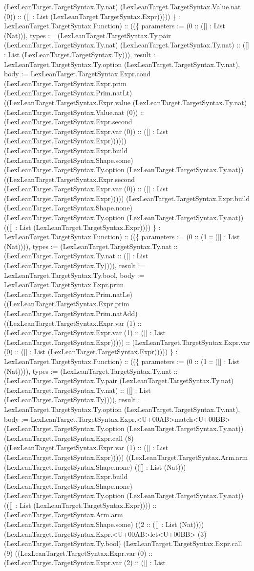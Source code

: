 \documentclass[11pt]{article}
\begin{document}
(LexLeanTarget.TargetSyntax.Ty.nat) (LexLeanTarget.TargetSyntax.Value.nat (0)) :: ([] : List (LexLeanTarget.TargetSyntax.Expr))))) \} : LexLeanTarget.TargetSyntax.Function) :: ((\{ parameters := (0 :: ([] : List (Nat))), types := (LexLeanTarget.TargetSyntax.Ty.pair (LexLeanTarget.TargetSyntax.Ty.nat) (LexLeanTarget.TargetSyntax.Ty.nat) :: ([] : List (LexLeanTarget.TargetSyntax.Ty))), result := LexLeanTarget.TargetSyntax.Ty.option (LexLeanTarget.TargetSyntax.Ty.nat), body := LexLeanTarget.TargetSyntax.Expr.cond (LexLeanTarget.TargetSyntax.Expr.prim (LexLeanTarget.TargetSyntax.Prim.natLt) ((LexLeanTarget.TargetSyntax.Expr.value (LexLeanTarget.TargetSyntax.Ty.nat) (LexLeanTarget.TargetSyntax.Value.nat (0)) :: (LexLeanTarget.TargetSyntax.Expr.second (LexLeanTarget.TargetSyntax.Expr.var (0)) :: ([] : List (LexLeanTarget.TargetSyntax.Expr)))))) (LexLeanTarget.TargetSyntax.Expr.build (LexLeanTarget.TargetSyntax.Shape.some) (LexLeanTarget.TargetSyntax.Ty.option (LexLeanTarget.TargetSyntax.Ty.nat)) ((LexLeanTarget.TargetSyntax.Expr.second (LexLeanTarget.TargetSyntax.Expr.var (0)) :: ([] : List (LexLeanTarget.TargetSyntax.Expr))))) (LexLeanTarget.TargetSyntax.Expr.build (LexLeanTarget.TargetSyntax.Shape.none) (LexLeanTarget.TargetSyntax.Ty.option (LexLeanTarget.TargetSyntax.Ty.nat)) (([] : List (LexLeanTarget.TargetSyntax.Expr)))) \} : LexLeanTarget.TargetSyntax.Function) :: ((\{ parameters := (0 :: (1 :: ([] : List (Nat)))), types := (LexLeanTarget.TargetSyntax.Ty.nat :: (LexLeanTarget.TargetSyntax.Ty.nat :: ([] : List (LexLeanTarget.TargetSyntax.Ty)))), result := LexLeanTarget.TargetSyntax.Ty.bool, body := LexLeanTarget.TargetSyntax.Expr.prim (LexLeanTarget.TargetSyntax.Prim.natLe) ((LexLeanTarget.TargetSyntax.Expr.prim (LexLeanTarget.TargetSyntax.Prim.natAdd) ((LexLeanTarget.TargetSyntax.Expr.var (1) :: (LexLeanTarget.TargetSyntax.Expr.var (1) :: ([] : List (LexLeanTarget.TargetSyntax.Expr))))) :: (LexLeanTarget.TargetSyntax.Expr.var (0) :: ([] : List (LexLeanTarget.TargetSyntax.Expr))))) \} : LexLeanTarget.TargetSyntax.Function) :: ((\{ parameters := (0 :: (1 :: ([] : List (Nat)))), types := (LexLeanTarget.TargetSyntax.Ty.nat :: (LexLeanTarget.TargetSyntax.Ty.pair (LexLeanTarget.TargetSyntax.Ty.nat) (LexLeanTarget.TargetSyntax.Ty.nat) :: ([] : List (LexLeanTarget.TargetSyntax.Ty)))), result := LexLeanTarget.TargetSyntax.Ty.option (LexLeanTarget.TargetSyntax.Ty.nat), body := LexLeanTarget.TargetSyntax.Expr.<U+00AB>match<U+00BB> (LexLeanTarget.TargetSyntax.Ty.option (LexLeanTarget.TargetSyntax.Ty.nat)) (LexLeanTarget.TargetSyntax.Expr.call (8) ((LexLeanTarget.TargetSyntax.Expr.var (1) :: ([] : List (LexLeanTarget.TargetSyntax.Expr))))) ((LexLeanTarget.TargetSyntax.Arm.arm (LexLeanTarget.TargetSyntax.Shape.none) (([] : List (Nat))) (LexLeanTarget.TargetSyntax.Expr.build (LexLeanTarget.TargetSyntax.Shape.none) (LexLeanTarget.TargetSyntax.Ty.option (LexLeanTarget.TargetSyntax.Ty.nat)) (([] : List (LexLeanTarget.TargetSyntax.Expr)))) :: (LexLeanTarget.TargetSyntax.Arm.arm (LexLeanTarget.TargetSyntax.Shape.some) ((2 :: ([] : List (Nat)))) (LexLeanTarget.TargetSyntax.Expr.<U+00AB>let<U+00BB> (3) (LexLeanTarget.TargetSyntax.Ty.bool) (LexLeanTarget.TargetSyntax.Expr.call (9) ((LexLeanTarget.TargetSyntax.Expr.var (0) :: (LexLeanTarget.TargetSyntax.Expr.var (2) :: ([] : List 
\end{document}
